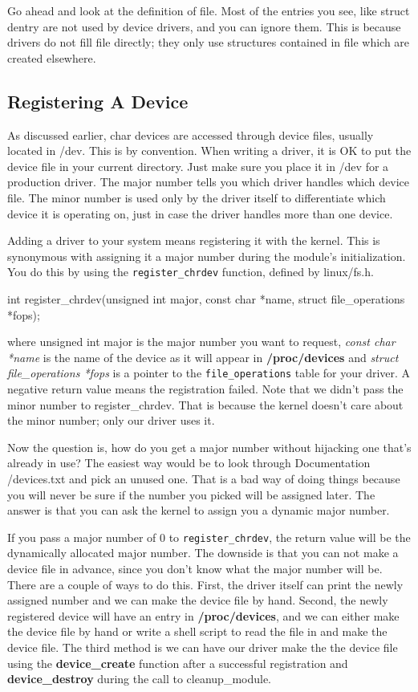 \documentclass[10pt, oneside]{book}
\begin{document}
Go ahead and look at the definition of file.
Most of the entries you see, like struct dentry are not used by device drivers, and you can ignore them.
This is because drivers do not fill file directly; they only use structures contained in file which are created elsewhere.

\subsection{Registering A Device}
\label{sec:register_device}
As discussed earlier, char devices are accessed through device files, usually located in /dev.
This is by convention. When writing a driver, it is OK to put the device file in your current directory.
Just make sure you place it in /dev for a production driver.
The major number tells you which driver handles which device file.
The minor number is used only by the driver itself to differentiate which device it is operating on, just in case the driver handles more than one device.

Adding a driver to your system means registering it with the kernel.
This is synonymous with assigning it a major number during the module's initialization.
You do this by using the \verb|register_chrdev| function, defined by linux/fs.h.

\begin{code}
int register_chrdev(unsigned int major, const char *name, struct file_operations *fops);
\end{code}

where unsigned int major is the major number you want to request, \emph{const char *name} is the name of the device as it will appear in \textbf{/proc/devices} and \emph{struct file\_operations *fops} is a pointer to the \verb|file_operations| table for your driver.
A negative return value means the registration failed. Note that we didn't pass the minor number to register\_chrdev.
That is because the kernel doesn't care about the minor number; only our driver uses it.

Now the question is, how do you get a major number without hijacking one that's already in use?
The easiest way would be to look through Documentation /devices.txt and pick an unused one.
That is a bad way of doing things because you will never be sure if the number you picked will be assigned later.
The answer is that you can ask the kernel to assign you a dynamic major number.

If you pass a major number of 0 to \verb|register_chrdev|, the return value will be the dynamically allocated major number.
The downside is that you can not make a device file in advance, since you don't know what the major number will be.
There are a couple of ways to do this.
First, the driver itself can print the newly assigned number and we can make the device file by hand.
Second, the newly registered device will have an entry in \textbf{/proc/devices}, and we can either make the device file by hand or write a shell script to read the file in and make the device file.
The third method is we can have our driver make the the device file using the \textbf{device\_create} function after a successful registration and \textbf{device\_destroy} during the call to cleanup\_module.
\end{document}
